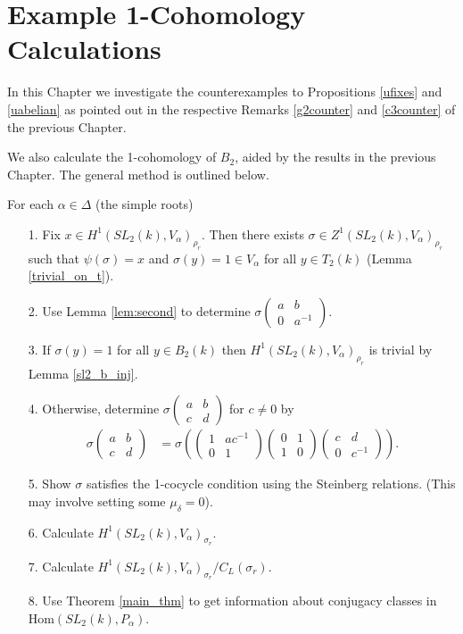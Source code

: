 
\chapter{Example 1-Cohomology Calculations}
\label{Chapter6}
In this Chapter we investigate the counterexamples to Propositions \ref{ufixes} and \ref{uabelian} as pointed out in the respective Remarks \ref{g2counter} and \ref{c3counter} of the previous Chapter.

We also calculate the 1-cohomology of $B_2$, aided by the results in the previous Chapter. The general method is outlined below.

For each $\alpha \in \Delta$ (the simple roots)
	\begin{itemize}
	\item[1.] Fix $x\in H^1(SL_2(k), V_\alpha)_{\rho_r}$. Then there exists $\sigma\in Z^1(SL_2(k), V_\alpha)_{\rho_r}$ such that $\psi(\sigma) = x$ and $\sigma\left(y\right) = 1 \in V_\alpha$ for all $y\in T_2(k)$ (Lemma \ref{trivial_on_t}).
	\item[2.] Use Lemma \ref{lem:second} to determine $\sigma\left(\begin{matrix}a & b\\0 & a^{-1}\end{matrix}\right)$. 
	\item[3.] If $\sigma\left(y\right) = 1$ for all $y\in B_2(k)$ then $H^1(SL_2(k), V_\alpha)_{\rho_r}$ is trivial by Lemma \ref{sl2_b_inj}.
	\item[4.] Otherwise, determine $\sigma\left(\begin{matrix}a & b\\c & d\end{matrix}\right)$ for $c \neq 0$ by
	\begin{align*}
	\sigma\left(\begin{matrix}a & b\\c & d\end{matrix}\right) &= \sigma\left(
			\left(\begin{matrix}1 & ac^{-1}\\0 & 1\end{matrix}\right)
			\left(\begin{matrix}0 & 1\\1 & 0\end{matrix}\right)
			\left(\begin{matrix}c & d\\0 & c^{-1}\end{matrix}\right)
			\right).
	\end{align*}
	\item[5.] Show $\sigma$ satisfies the 1-cocycle condition using the Steinberg relations. (This may involve setting some $\mu_\delta=0$).
	\item[6.] Calculate $H^1(SL_2(k), V_\alpha)_{\sigma_r}$.
	\item[7.] Calculate $H^1(SL_2(k), V_\alpha)_{\sigma_r}/C_L(\sigma_r)$.
	\item[8.] Use Theorem \ref{main_thm} to get information about conjugacy classes in $\mathrm{Hom}(SL_2(k), P_\alpha)$.
	\end{itemize}

